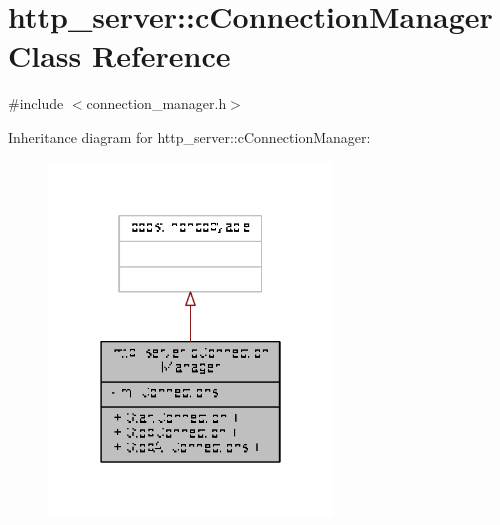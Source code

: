 \hypertarget{classhttp__server_1_1cConnectionManager}{\section{http\-\_\-server\-:\-:c\-Connection\-Manager Class Reference}
\label{classhttp__server_1_1cConnectionManager}
}


{\ttfamily \#include $<$connection\-\_\-manager.\-h$>$}



Inheritance diagram for http\-\_\-server\-:\-:c\-Connection\-Manager\-:
\nopagebreak
\begin{figure}[H]
\begin{center}
\leavevmode
\includegraphics[width=214pt]{classhttp__server_1_1cConnectionManager__inherit__graph}
\end{center}
\end{figure}


